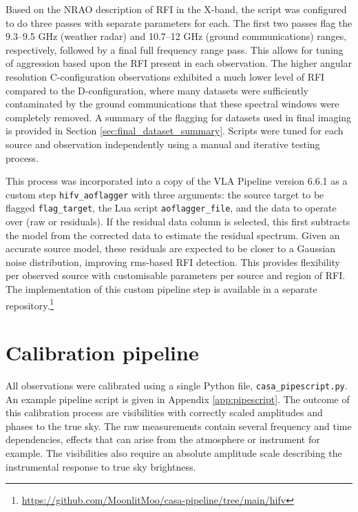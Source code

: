 Based on the NRAO description of RFI in the X-band, the script was configured to do three passes with separate parameters for each. The first two passes flag the 9.3--9.5 GHz (weather radar) and 10.7--12 GHz (ground communications) ranges, respectively, followed by a final full frequency range pass. This allows for tuning of aggression based upon the RFI present in each observation. The higher angular resolution C-configuration observations exhibited a much lower level of RFI compared to the D-configuration, where many datasets were sufficiently contaminated by the ground communications that these spectral windows were completely removed. A summary of the flagging for datasets used in final imaging is provided in Section \ref{sec:final_dataset_summary}. Scripts were tuned for each source and observation independently using a manual and iterative testing process.

This process was incorporated into a copy of the VLA Pipeline version 6.6.1 as a custom step \texttt{hifv\_aoflagger} with three arguments: the source target to be flagged \texttt{flag\_target}, the Lua script \texttt{aoflagger\_file}, and the data to operate over (raw or residuals). If the residual data column is selected, this first subtracts the model from the corrected data to estimate the residual spectrum. Given an accurate source model, these residuals are expected to be closer to a Gaussian noise distribution, improving rms-based RFI detection. This provides flexibility per observed source with customisable parameters per source and region of RFI. The implementation of this custom pipeline step is available in a separate repository.\footnote{\url{https://github.com/MoonlitMoo/casa-pipeline/tree/main/hifv}}

\section{Calibration pipeline}
\label{sec:calibration_steps}

All observations were calibrated using a single Python file, \texttt{casa\_pipescript.py}. An example pipeline script is given in Appendix \ref{app:pipescript}. The outcome of this calibration process are visibilities with correctly scaled amplitudes and phases to the true sky. The raw measurements contain several frequency and time dependencies, effects that can arise from the atmosphere or instrument for example. The visibilities also require an absolute amplitude scale describing the instrumental response to true sky brightness.

